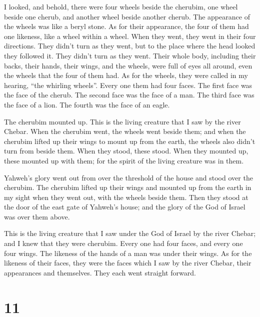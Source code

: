  I looked, and behold, there were four wheels beside the
cherubim, one wheel beside one cherub, and another wheel beside another
cherub. The appearance of the wheels was like a beryl stone.
 As for their appearance, the four of them had one
likeness, like a wheel within a wheel.  When they went,
they went in their four directions. They didn't turn as they went, but
to the place where the head looked they followed it. They didn't turn as
they went.  Their whole body, including their backs,
their hands, their wings, and the wheels, were full of eyes all around,
even the wheels that the four of them had.  As for the
wheels, they were called in my hearing, ``the whirling wheels''.
 Every one them had four faces. The first face was the
face of the cherub. The second face was the face of a man. The third
face was the face of a lion. The fourth was the face of an eagle.

 The cherubim mounted up. This is the living creature
that I saw by the river Chebar.  When the cherubim went,
the wheels went beside them; and when the cherubim lifted up their wings
to mount up from the earth, the wheels also didn't turn from beside
them.  When they stood, these stood. When they mounted
up, these mounted up with them; for the spirit of the living creature
was in them.

 Yahweh's glory went out from over the threshold of the
house and stood over the cherubim.  The cherubim lifted
up their wings and mounted up from the earth in my sight when they went
out, with the wheels beside them. Then they stood at the door of the
east gate of Yahweh's house; and the glory of the God of Israel was over
them above.

 This is the living creature that I saw under the God of
Israel by the river Chebar; and I knew that they were cherubim.
 Every one had four faces, and every one four wings. The
likeness of the hands of a man was under their wings.  As
for the likeness of their faces, they were the faces which I saw by the
river Chebar, their appearances and themselves. They each went straight
forward.

\hypertarget{section-9}{%
\section{11}\label{section-9}}

